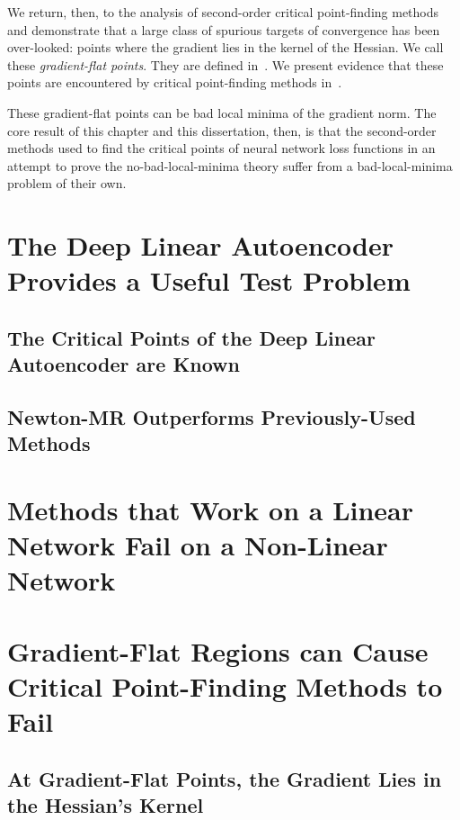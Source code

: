 \documentclass[../../thesis.tex]{subfiles}
\begin{document}
We return, then, to the analysis of second-order
critical point-finding methods and demonstrate
that a large class of spurious targets of convergence
has been over-looked:
points where the gradient lies in the kernel of the Hessian.
We call these \emph{gradient-flat points}.
They are defined in~.
We present evidence that these points are encountered
by critical point-finding methods in~.

These gradient-flat points can be
bad local minima of the gradient norm.
The core result of this chapter
and this dissertation, then,
is that the second-order methods
used to find the critical points
of neural network loss functions
in an attempt to prove the no-bad-local-minima theory
suffer from a bad-local-minima problem of their own.

\section{The Deep Linear Autoencoder Provides a Useful Test Problem}%

\subsection{The Critical Points of the Deep Linear Autoencoder are Known}%

\subsection{Newton-MR Outperforms Previously-Used Methods}%

\section{Methods that Work on a Linear Network Fail on a Non-Linear Network}%

\section{Gradient-Flat Regions can Cause Critical Point-Finding Methods to Fail}%

\subsection{At Gradient-Flat Points, the Gradient Lies in the Hessian's Kernel}%
\end{document}
